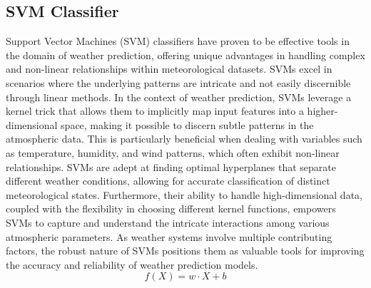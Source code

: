 \documentclass[conference, onecolumn]{IEEEtran}
\begin{document}
\subsection{\textbf{SVM Classifier}}
Support Vector Machines (SVM) classifiers have proven to be effective tools in the domain of weather prediction, offering unique advantages in handling complex and non-linear relationships within meteorological datasets. SVMs excel in scenarios where the underlying patterns are intricate and not easily discernible through linear methods. In the context of weather prediction, SVMs leverage a kernel trick that allows them to implicitly map input features into a higher-dimensional space, making it possible to discern subtle patterns in the atmospheric data. This is particularly beneficial when dealing with variables such as temperature, humidity, and wind patterns, which often exhibit non-linear relationships. SVMs are adept at finding optimal hyperplanes that separate different weather conditions, allowing for accurate classification of distinct meteorological states. Furthermore, their ability to handle high-dimensional data, coupled with the flexibility in choosing different kernel functions, empowers SVMs to capture and understand the intricate interactions among various atmospheric parameters. As weather systems involve multiple contributing factors, the robust nature of SVMs positions them as valuable tools for improving the accuracy and reliability of weather prediction models.
\\ \[ f(X) = w \cdot X + b \]
\end{document}
